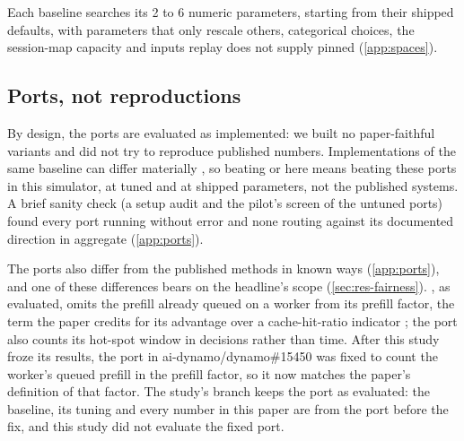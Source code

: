 Each baseline searches its 2 to 6 numeric parameters, starting from their shipped defaults, with
parameters that only rescale others, categorical choices, the session-map capacity and inputs replay does not
supply pinned (\cref{app:spaces}).

\subsection{Ports, not reproductions}
\label{sec:ports}

By design, the ports are evaluated as implemented: we built no paper-faithful variants and did not
try to reproduce published numbers. Implementations of the same baseline can differ materially
\citep{henderson2018matters}, so beating  or  here means beating
these ports in this simulator, at tuned and at shipped parameters, not the published systems. A
brief sanity check (a setup audit and the pilot's screen of the untuned ports) found every port
running without error and none routing against its documented direction in aggregate
(\cref{app:ports}).

The ports also differ from the published methods in known ways (\cref{app:ports}), and one of these
differences bears on the headline's scope (\cref{sec:res-fairness}). , as evaluated,
omits the prefill already queued on a worker from its prefill factor, the term the paper credits
for its advantage over a cache-hit-ratio indicator \citep{zhang2026lmetric}; the port also counts
its hot-spot window in decisions rather than time. After this study froze its results, the port in
ai-dynamo/dynamo\#15450 was fixed to count the worker's queued prefill in the prefill factor, so it
now matches the paper's definition of that factor. The study's branch keeps the port as evaluated:
the  baseline, its tuning and every  number in this paper are from
the port before the fix, and this study did not evaluate the fixed port.

